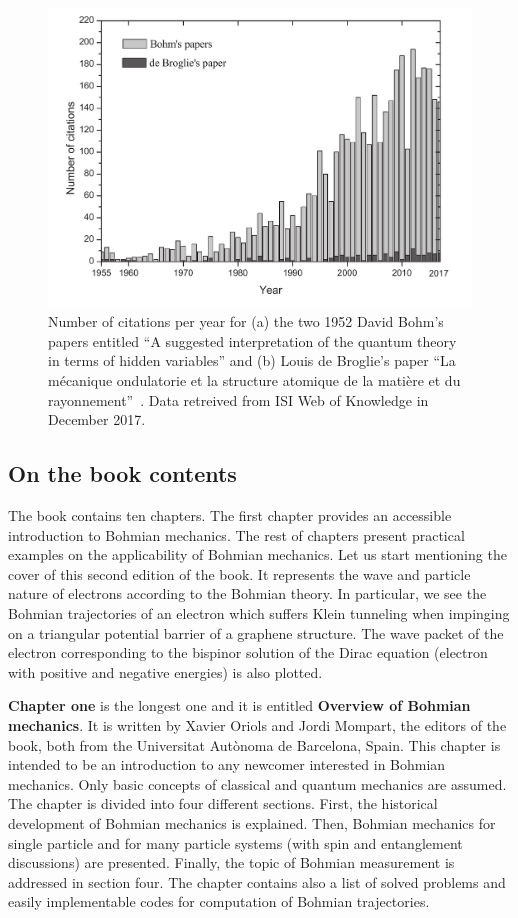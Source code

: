 \documentclass[nofootinbib, secnumarabic, amsmath, nobibnotes,11pt,aps,pra, floatfix]{revtex4-1}
\begin{document}
\begin{figure}
\centering
\includegraphics*[width=13cm]{F0_citations.pdf}
\caption{Number of citations per year for (a) the two 1952 David Bohm's papers entitled ``A suggested interpretation of the quantum theory in terms of hidden variables'' \cite{om.bohm1952a,om.bohm1952b} and (b) Louis de Broglie's paper ``La m\'ecanique ondulatorie et la structure atomique de la mati\`ere et du rayonnement''~\cite{om.debroglie1927b}. Data retreived from ISI Web of Knowledge \cite{om.isiweb} in December 2017.}
\nonumber
\label{om_Datos_Bohm}
\end{figure}

\subsection{On the book contents}

The book contains ten chapters. The first chapter provides an accessible introduction to Bohmian mechanics. The rest of chapters present practical examples on the applicability of Bohmian mechanics. Let us start mentioning the cover of this second edition of the book. It represents the wave and particle nature of electrons according to the Bohmian theory. In particular, we see the Bohmian trajectories of an electron which suffers Klein tunneling when impinging on a triangular potential barrier of a graphene structure. The wave packet of the electron corresponding to the bispinor solution of the Dirac equation (electron with positive and negative energies) is also plotted. 

\textbf{Chapter one} is the longest one and it is entitled \textbf{Overview of Bohmian mechanics}. It is written by Xavier Oriols and Jordi Mompart, the editors of the book, both from the Universitat Aut\`{o}noma de Barcelona, Spain. This chapter is intended to be an introduction to any newcomer interested in Bohmian mechanics.  Only basic concepts of classical and quantum mechanics are assumed. The chapter is divided into four different sections. First, the historical development of Bohmian mechanics is explained. Then, Bohmian mechanics for single particle and for many particle systems (with spin and entanglement discussions) are presented. Finally, the topic of Bohmian measurement is addressed in section four. The chapter contains also a list of solved problems and easily implementable codes for computation of Bohmian trajectories.
\end{document}
